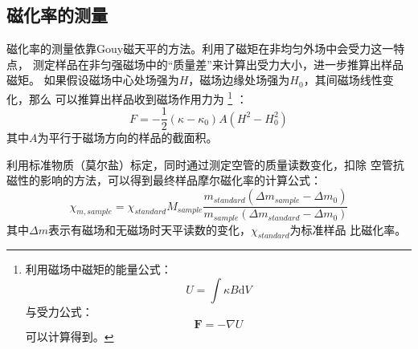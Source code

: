 \documentclass[a4paper,zihao=5,UTF8]{ctexart}
\def\d{\mathrm{d}}
\newcommand{\mb}[1]{\mathbf{#1}}
\begin{document}
        \subsection{磁化率的测量}
        磁化率的测量依靠Gouy磁天平的方法。利用了磁矩在非均匀外场中会受力这一特点，
        测定样品在非匀强磁场中的“质量差”来计算出受力大小，进一步推算出样品磁矩。
        如果假设磁场中心处场强为$H$，磁场边缘处场强为$H_0$，其间磁场线性变化，那么
        可以推算出样品收到磁场作用力为
        \footnote{
            利用磁场中磁矩的能量公式：
            \begin{equation}
                U = \int\kappa B\d V
            \end{equation}
            与受力公式：
            \begin{equation}
                \mb{F} = -\nabla U
            \end{equation}
            可以计算得到。
        }
        ：
        \begin{equation}
            F = -\frac{1}{2}(\kappa - \kappa_0)A(H^2 - H_0^2)
        \end{equation}
        其中$A$为平行于磁场方向的样品的截面积。
        \par 
        利用标准物质（莫尔盐）标定，同时通过测定空管的质量读数变化，扣除
        空管抗磁性的影响的方法，可以得到最终样品摩尔磁化率的计算公式：
        \begin{equation}
            \chi_{m,sample} = \chi_{standard}M_{sample}\frac{m_{standard}(\Delta m_{sample} - \Delta m_{0})}
            {m_{sample}(\Delta m_{standard} - \Delta m_{0})}
        \end{equation}
        其中$\Delta m$表示有磁场和无磁场时天平读数的变化，$\chi_{standard}$为标准样品
        比磁化率。
\end{document}
